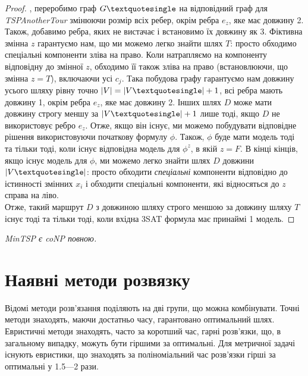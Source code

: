 \begin{proof}
, переробимо граф $G\textquotesingle$ на відповідний граф для \emph{TSPAnotherTour}
змінюючи розмір всіх ребер, окрім ребра $e_{z}$, яке має довжину 2. Також, добавимо ребра, яких не
вистачає і встановимо їх довжину як 3. 
Фіктивна змінна $z$ гарантуємо нам, що ми можемо легко знайти шлях $T$:
просто обходимо спеціальні компоненти зліва на право. Коли натрапляємо на компоненту відповідну до
змінної $z$, обходимо її також зліва на право (встановлюючи, що змінна $z = T$), включаючи
усі $c_{j}$. Така побудова графу гарантуємо нам довжину усього шляху рівну точно $|V| = |V\textquotesingle|
+ 1$, всі ребра мають довжину 1, окрім ребра $e_{z}$, яке має довжину 2.
Інших шлях $D$ може мати довжину строгу меншу за $|V\textquotesingle|+1$ лише тоді, якщо 
$D$ не використовує ребро $e_{z}$. Отже, якщо він існує, ми можемо побудувати 
відповідне рішення використовуючи початкову формулу $\phi$. Також, $\phi$ буде мати модель
тоді та тільки тоді, коли існує відповідна модель для $\phi^{z}$, в якій $z=F$.
В кінці кінців, якщо існує модель для $\phi$, ми можемо легко знайти шлях $D$
довжини $|V\textquotesingle|$: просто обходити \emph{спеціальні} компоненти відповідно
до істинності змінних $x_{i}$ і обходити спеціальні компоненти, які відносяться до $z$ справа
на ліво. 
\\Отже, такий маршрут $D$ з довжиною шляху строго меншою за довжину шляху $T$ існує тоді та тільки тоді,
коли вхідна 3SAT формула має принаймі 1 модель.

\end{proof}

\begin{corollary}
    \emph{MinTSP є coNP повною. }
\end{corollary}

\section{Наявні методи розвязку}

Відомі методи розв'язання поділяють на дві групи, що можна комбінувати. 
Точні методи знаходять, маючи достатньо часу, гарантовано оптимальний шлях.
Евристичні методи знаходять, часто за коротший час, гарні розв'язки, що, в загальному випадку,
можуть бути гіршими за оптимальні. Для метричної задачі існують евристики, що знаходять за
поліноміальний час розв'язки гірші за оптимальні у 1.5—2 рази.

